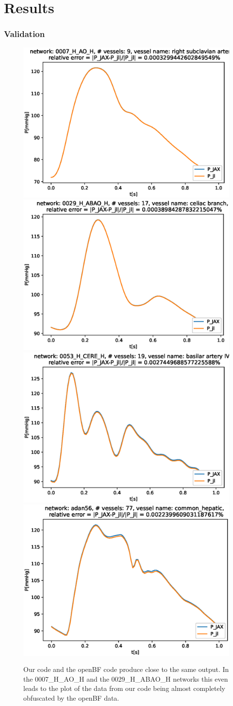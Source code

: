 \documentclass{beamer}
\begin{document}
\section{Results}
\begin{frame}
	\frametitle{Validation}
	\begin{figure} [H]
		\centering
		\includegraphics[width=0.33\columnwidth]{images/0007_H_AO_H_right_subclavian_artery_P.eps}
		\includegraphics[width=0.33\columnwidth]{images/0029_H_ABAO_H_celiac_branch_P.eps
		}
		\includegraphics[width=0.33\columnwidth]{images/0053_H_CERE_H_basilar_artery_IV_P.eps}
		\includegraphics[width=0.33\columnwidth]{images/adan56_common_hepatic_P.eps}
		\caption{Our code and the openBF code produce close
		to the same output.
	In the 0007\_H\_AO\_H and the 0029\_H\_ABAO\_H networks this even leads to the plot of the data from our code being almost completely obfuscated by the openBF data.}
		\label{fig:val}
	\end{figure}
\end{frame}
\end{document}
